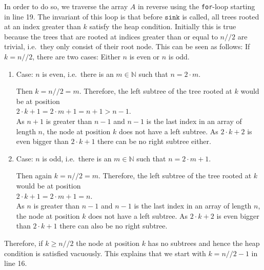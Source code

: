 \begin{enumerate}
\begin{enumerate}
            In order to do so, we traverse the array ${A}$ in reverse using the
            \texttt{for}-loop starting in line 19.  The invariant of this loop is that before
            $\texttt{sink}$ is called, all trees rooted at an index greater than 
            ${k}$ satisfy the heap condition.  Initially this is true because the trees that
            are rooted at indices greater than or equal to ${n}// 2$ are trivial, i.e.~they only
            consist of their root node.  This can be seen as follows:  If $k = n//2$, there are two cases:
            Either $n$ is even or $n$ is odd.
            \begin{enumerate}
            \item Case: $n$ is even, i.e.~there is an $m\in \mathbb{N}$ such that $n = 2 \cdot m$.

                  Then $k = n//2 = m$.  Therefore, the left subtree of the tree 
                  rooted at $k$ would be at position 
                  \\[0.2cm]
                  \hspace*{1.3cm}
                  $2 \cdot k + 1 = 2 \cdot m + 1 = n + 1 > n-1$.
                  \\[0.2cm]
                  As $n + 1$ is greater than $n-1$ and $n-1$ is the last index in an array of length $n$, the
                  node at position $k$ does not have a left subtree.  As $2 \cdot k + 2$ is even 
                  bigger than $2 \cdot k + 1$ there can be no right subtree either.
            \item Case: $n$ is odd, i.e.~there is an $m \in \mathbb{N}$ such that $n = 2 \cdot m + 1$.

                  Then again $k = n//2 = m$.  Therefore, the left subtree of the tree rooted at $k$ would be
                  at position
                  \\[0.2cm]
                  \hspace*{1.3cm}
                  $2 \cdot k + 1 = 2 \cdot m + 1 = n$.
                  \\[0.2cm]
                  As $n$ is greater than $n-1$ and $n-1$ is the last index in an array of length $n$, 
                  the node at position $k$ does not have a left subtree.  As $2 \cdot k + 2$ is even
                  bigger than $2 \cdot k + 1$ there can also be no right subtree.
            \end{enumerate}
            Therefore, if $k \geq n//2$ the node at position $k$ has no subtrees and hence the heap
            condition is satisfied vacuously.   This explains that we start with $k = n//2 - 1$ in line 16.
            

\end{enumerate}
\end{enumerate}

